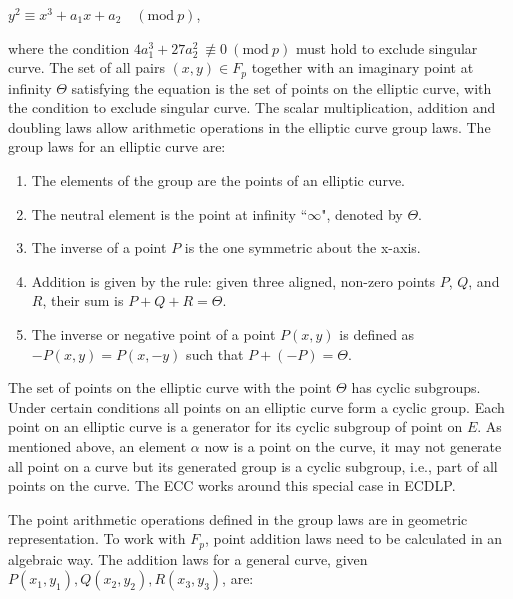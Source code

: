 \begin{center}
  $y^2 \equiv x^3 + a_1x + a_2 \quad (\text{mod} \ p)$,
\end{center}

where the condition $4a_1^3 + 27a_2^2 \ \not\equiv 0 \ (\text{mod} \ p)$ must hold to exclude singular curve. The set of all pairs $(x,y) \in F_p$ together with an imaginary point at infinity $\Theta$ satisfying the equation is the set of points on the elliptic curve, with the condition to exclude singular curve. The scalar multiplication, addition and doubling laws allow arithmetic operations in the elliptic curve group laws. The group laws for an elliptic curve are:

\begin{enumerate}
  \item The elements of the group are the points of an elliptic curve.
  \item The neutral element is the point at infinity ``$\infty$", denoted by $\Theta$.
  \item The inverse of a point $P$ is the one symmetric about the x-axis.
  \item Addition is given by the rule: given three aligned, non-zero points $P$, $Q$, and $R$, their sum is $P + Q + R = \Theta$.
  \item The inverse or negative point of a point $P(x,y)$ is defined as $-P(x,y) = P(x,-y)$ such that $P + (-P) = \Theta$.
\end{enumerate}

The set of points on the elliptic curve with the point $\Theta$ has cyclic subgroups. Under certain conditions all points on an elliptic curve form a cyclic group. Each point on an elliptic curve is a generator for its cyclic subgroup of point on $E$. As mentioned above, an element $\alpha$ now is a point on the curve, it may not generate all point on a curve but its generated group is a cyclic subgroup, i.e., part of all points on the curve. The ECC works around this special case in ECDLP.

The point arithmetic operations defined in the group laws are in geometric representation. To work with $F_p$, point addition laws need to be calculated in an algebraic way. The addition laws for a general curve, given $P(x_1, y_1), Q(x_2, y_2), R(x_3, y_3)$, are:

